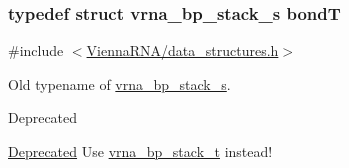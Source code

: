 \subsubsection[{bond\+T}]{\setlength{\rightskip}{0pt plus 5cm}typedef struct {\bf vrna\+\_\+bp\+\_\+stack\+\_\+s} {\bf bond\+T}}\label{group__data__structures_gaaeed53a7508c6ce549a98223e94b25df}


{\ttfamily \#include $<$\hyperlink{data__structures_8h}{Vienna\+R\+N\+A/data\+\_\+structures.\+h}$>$}



Old typename of \hyperlink{group__data__structures_structvrna__bp__stack__s}{vrna\+\_\+bp\+\_\+stack\+\_\+s}. 

\begin{DoxyRefDesc}{Deprecated}
\item[\hyperlink{deprecated__deprecated000050}{Deprecated}]Use \hyperlink{group__data__structures_gaa651bda42e7692f08cb603cd6834b0ee}{vrna\+\_\+bp\+\_\+stack\+\_\+t} instead! \end{DoxyRefDesc}
